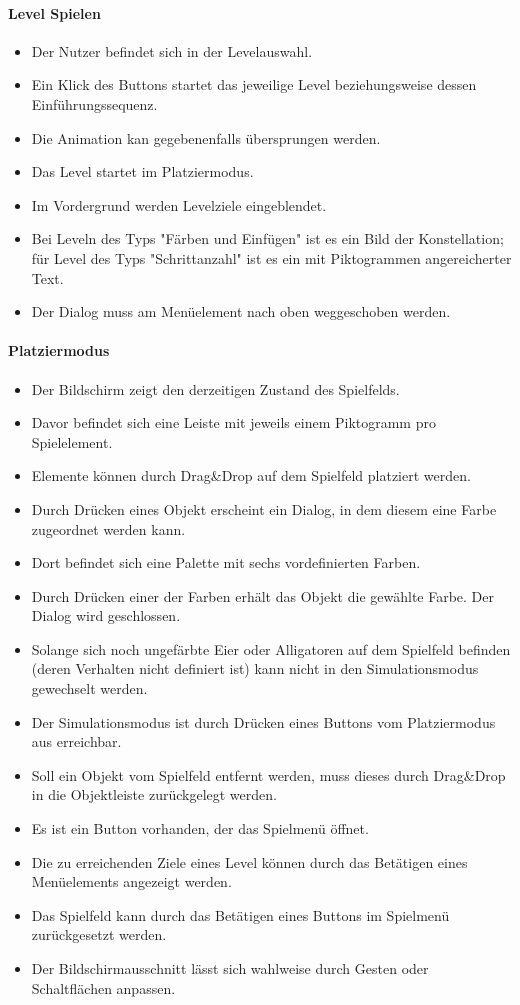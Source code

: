 \paragraph{Level Spielen}
\begin{itemize}
\item Der Nutzer befindet sich in der Levelauswahl.
\item Ein Klick des Buttons startet das jeweilige Level beziehungsweise dessen Einführungssequenz. 
\item Die Animation kan gegebenenfalls übersprungen werden.
\item Das Level startet im Platziermodus.
\item Im Vordergrund werden Levelziele eingeblendet.
\item Bei Leveln des Typs "Färben und Einfügen"  ist es ein Bild der Konstellation; für Level des Typs "Schrittanzahl" ist es ein mit Piktogrammen angereicherter Text.
\item Der Dialog muss am Menüelement nach oben weggeschoben werden. 
\end{itemize}


\paragraph{Platziermodus}
\begin{itemize}  
\item Der Bildschirm zeigt den derzeitigen Zustand des Spielfelds.
\item Davor befindet sich eine Leiste mit jeweils einem Piktogramm pro Spielelement.
\item Elemente können durch Drag\&Drop auf dem Spielfeld platziert werden. 
\item  Durch Drücken eines Objekt erscheint 
ein Dialog, in dem diesem eine Farbe zugeordnet werden kann.
\item Dort befindet sich eine Palette mit sechs vordefinierten Farben.
\item Durch Drücken einer der Farben erhält das Objekt die gewählte Farbe. Der Dialog wird geschlossen.
\item Solange sich noch ungefärbte Eier oder Alligatoren auf dem Spielfeld befinden (deren Verhalten
nicht definiert ist) kann nicht in den Simulationsmodus gewechselt werden.
\item Der Simulationsmodus ist durch Drücken eines Buttons vom Platziermodus
aus erreichbar.
\item Soll ein Objekt vom Spielfeld entfernt werden, muss dieses durch Drag\&Drop
in die Objektleiste zurückgelegt werden.
\item Es ist ein Button vorhanden, der das Spielmenü öffnet.
\item Die zu erreichenden Ziele eines Level können durch das Betätigen eines Menüelements angezeigt werden.
\item Das Spielfeld kann durch das Betätigen eines Buttons im Spielmenü zurückgesetzt werden.
\item Der Bildschirmausschnitt lässt sich wahlweise durch Gesten oder Schaltflächen anpassen.
\end{itemize}

